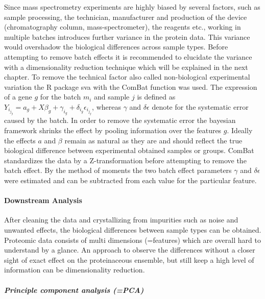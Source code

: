 \documentclass[
  11pt,
]{article}
\begin{document}
Since mass spectrometry experiments are highly biased by several
factors, such as sample processing, the technician, manufacturer and
production of the device (chromatography column, mass-spectrometer), the
reagents etc., working in multiple batches introduces further variance
in the protein data. This variance would overshadow the biological
differences across sample types. Before attempting to remove batch
effects it is recommended to elucidate the variance with a
dimensionality reduction technique which will be explained in the next
chapter. To remove the technical factor also called non-biological
experimental variation the R package sva \citep{Leek2012} with the
ComBat function \citep{Johnson2007} was used. The expression of a gene
\(g\) for the batch \(m_i\) and sample \(j\) is defined as
\(Y_i_j_g = a_g + X\beta_g + \gamma_i_g + \delta_i_g\epsilon_i_j_g\),
whereas \(\gamma\) and \(\delta\epsilon\) denote for the systematic
error caused by the batch. In order to remove the systematic error the
bayesian framework shrinks the effect by pooling information over the
features \(g\). Ideally the effects \(a\) and \(\beta\) remain as
natural as they are and should reflect the true biological difference
between experimental obtained samples or groups. ComBat standardizes the
data by a Z-transformation before attempting to remove the batch effect.
By the method of moments the two batch effect parameters \(\gamma\) and
\(\delta\epsilon\) were estimated and can be subtracted from each value
for the particular feature.

\hypertarget{downstream-analysis}{%
\paragraph{Downstream Analysis}\label{downstream-analysis}}

After cleaning the data and crystallizing from impurities such as noise
and unwanted effects, the biological differences between sample types
can be obtained. Proteomic data consists of multi dimensions (=features)
which are overall hard to understand by a glance. An approach to observe
the differences without a closer sight of exact effect on the
proteinaceous ensemble, but still keep a high level of information can
be dimensionality reduction.

\hypertarget{principle-component-analysis-pca}{%
\subparagraph{Principle component analysis
(=PCA)}\label{principle-component-analysis-pca}}
\end{document}
